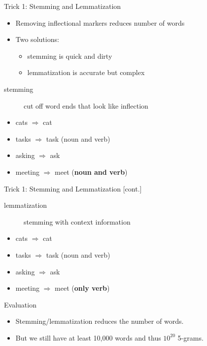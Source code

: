 \documentclass[professionalfonts, xcolor={usenames,svgnames,x11names,table}]{beamer}
\begin{document}
\begin{frame}{Trick 1: Stemming and Lemmatization}
    \begin{itemize}
        \item Removing inflectional markers reduces number of words
        \item Two solutions:
            \begin{itemize}
                \item stemming is quick and dirty
                \item lemmatization is accurate but complex
            \end{itemize}
    \end{itemize}

    \begin{description}
        \item[stemming] cut off word ends that look like inflection
    \end{description}

    \begin{example}
        \begin{itemize}
            \item cats $\Rightarrow$ cat
            \item tasks $\Rightarrow$ task (noun and verb)
            \item asking $\Rightarrow$ ask
            \item meeting $\Rightarrow$ meet (\textbf{noun and verb})
        \end{itemize}
    \end{example}
\end{frame}

\begin{frame}{Trick 1: Stemming and Lemmatization [cont.]}
    \begin{description}
        \item[lemmatization] stemming with context information
    \end{description}

    \begin{example}
        \begin{itemize}
            \item cats $\Rightarrow$ cat
            \item tasks $\Rightarrow$ task (noun and verb)
            \item asking $\Rightarrow$ ask
            \item meeting $\Rightarrow$ meet (\textbf{only verb})
        \end{itemize}
    \end{example}

    \begin{block}{Evaluation}
        \begin{itemize}
            \item Stemming\slash lemmatization reduces the number of words.
            \item But we still have at least 10,000 words and thus $10^{20}$ 5-grams.
        \end{itemize}
    \end{block}
\end{frame}
\end{document}
